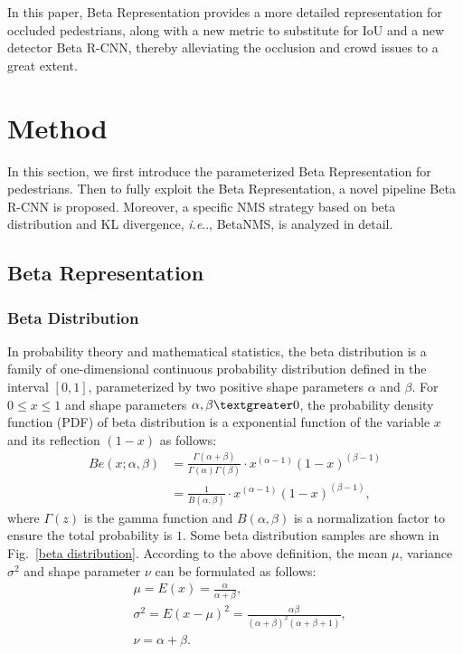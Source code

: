 \documentclass{article}
\makeatletter
\DeclareRobustCommand\onedot{\futurelet\@let@token\@onedot}
\def\@onedot{\ifx\@let@token.\else.\null\fi\xspace}
\def\ie{\emph{i.e}\onedot} \def\Ie{\emph{I.e}\onedot}
\makeatother
\begin{document}
In this paper, Beta Representation provides a more detailed representation for occluded pedestrians, along with a new metric to substitute for IoU and a new detector Beta R-CNN, thereby alleviating the occlusion and crowd issues to a great extent.

\section{Method}
\label{method}
In this section, we first introduce the parameterized Beta Representation for pedestrians.
Then to fully exploit the Beta Representation, a novel pipeline Beta R-CNN is proposed.
Moreover, a specific NMS strategy based on beta distribution and KL divergence, \ie, BetaNMS, is analyzed in detail.

\subsection{Beta Representation}
\label{beta theory}

\subsubsection{Beta Distribution}
\label{beta distribution theory}
In probability theory and mathematical statistics, the beta distribution is a family of one-dimensional continuous probability distribution defined in the interval $[0, 1]$, parameterized by two positive shape parameters $\alpha$ and $\beta$.
For $0\leq x \leq 1$ and shape parameters $\alpha, \beta \textgreater 0$, the probability density function (PDF) of beta distribution is a exponential function of the variable $x$ and its reflection $(1-x)$ as follows:
\begin{equation}
    \begin{split}
        Be(x; \alpha, \beta) 
        &= \frac{\Gamma(\alpha + \beta)}{\Gamma(\alpha) \Gamma(\beta)}\cdot x^{(\alpha-1)} (1-x)^{(\beta-1)} \\
        &= \frac{1}{B(\alpha, \beta)} \cdot x^{(\alpha-1)} (1-x)^{(\beta-1)},
    \end{split}
\end{equation}
where $\Gamma(z)$ is the gamma function and $B(\alpha, \beta)$ is a normalization factor to ensure the total probability is $1$. 
Some beta distribution samples are shown in Fig.~\ref{beta distribution}. According to the above definition, the mean $\mu$, variance $\sigma^2$ and shape parameter $\nu$ can be formulated as follows:
\begin{equation}
     \begin{split}
        & \mu = E(x) = \frac{\alpha}{\alpha + \beta} , \\
        & \sigma^2 = E(x-\mu)^2 = \frac{\alpha \beta}{(\alpha + \beta)^2 (\alpha + \beta + 1)} , \\
        & \nu = \alpha + \beta .
    \end{split}
\end{equation}
    
\end{document}
